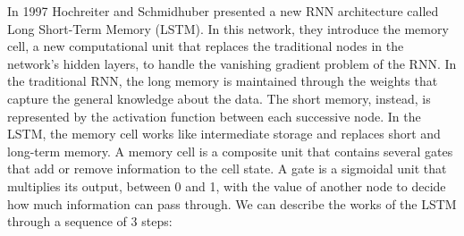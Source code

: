 In 1997 Hochreiter and Schmidhuber presented a new RNN architecture called Long Short-Term Memory (LSTM).
In this network, they introduce the memory cell, a new computational unit that replaces the traditional nodes in the network's hidden layers, to handle the vanishing gradient problem of the RNN.
In the traditional RNN, the long memory is maintained through the weights that capture the general knowledge about the data.
The short memory, instead, is represented by the activation function between each successive node.
In the LSTM, the memory cell works like intermediate storage and replaces short and long-term memory.
A memory cell is a composite unit that contains several gates that add or remove information to the cell state.
A gate is a sigmoidal unit that multiplies its output, between 0 and 1, with the value of another node to decide how much information can pass through.
We can describe the works of the LSTM through a sequence of 3 steps: 
